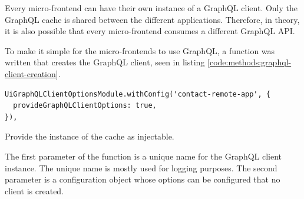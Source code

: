 \documentclass[MSE,Master,english]{twbook}%
\begin{document}
\ifshowUnusedContent

\fi

Every micro-frontend can have their own instance of a GraphQL client. Only the GraphQL cache is shared between the different applications. Therefore, in theory, it is also possible that every micro-frontend consumes a different GraphQL API. 

\ifshowUnusedContent
\fi

To make it simple for the micro-frontends to use GraphQL, a function was written that creates the GraphQL client, seen in listing \ref{code:methods:graphql-client-creation}.

\ifshowListings
\begin{listing}[H]
\begin{verbatim}
UiGraphQLClientOptionsModule.withConfig('contact-remote-app', { 
  provideGraphQLClientOptions: true,
}),
\end{verbatim}
\caption{Provide the instance of the cache as injectable.}\label{code:methods:graphql-client-creation}
\end{listing}
\fi

The first parameter of the function is a unique name for the GraphQL client instance. The unique name is mostly used for logging purposes. The second parameter is a configuration object whose options can be configured that no client is created.  
\end{document}

